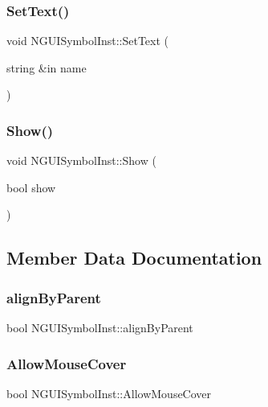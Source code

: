 \subsubsection{\texorpdfstring{Set\+Text()}{SetText()}}
{\footnotesize\ttfamily void N\+G\+U\+I\+Symbol\+Inst\+::\+Set\+Text (\begin{DoxyParamCaption}\item[{string \&in}]{name }\end{DoxyParamCaption})}

\hypertarget{class_n_g_u_i_symbol_inst_a46bdaa7278a761678465e3c237b078fe}{}\label{class_n_g_u_i_symbol_inst_a46bdaa7278a761678465e3c237b078fe} 
\subsubsection{\texorpdfstring{Show()}{Show()}}
{\footnotesize\ttfamily void N\+G\+U\+I\+Symbol\+Inst\+::\+Show (\begin{DoxyParamCaption}\item[{bool}]{show }\end{DoxyParamCaption})}



\subsection{Member Data Documentation}
\hypertarget{class_n_g_u_i_symbol_inst_a2cecb575b74c18fa4a0469d54cd8d52e}{}\label{class_n_g_u_i_symbol_inst_a2cecb575b74c18fa4a0469d54cd8d52e} 
\subsubsection{\texorpdfstring{align\+By\+Parent}{alignByParent}}
{\footnotesize\ttfamily bool N\+G\+U\+I\+Symbol\+Inst\+::align\+By\+Parent}

\hypertarget{class_n_g_u_i_symbol_inst_a48281d9bc7e62f037fcb853f391b4d44}{}\label{class_n_g_u_i_symbol_inst_a48281d9bc7e62f037fcb853f391b4d44} 
\subsubsection{\texorpdfstring{Allow\+Mouse\+Cover}{AllowMouseCover}}
{\footnotesize\ttfamily bool N\+G\+U\+I\+Symbol\+Inst\+::\+Allow\+Mouse\+Cover}

